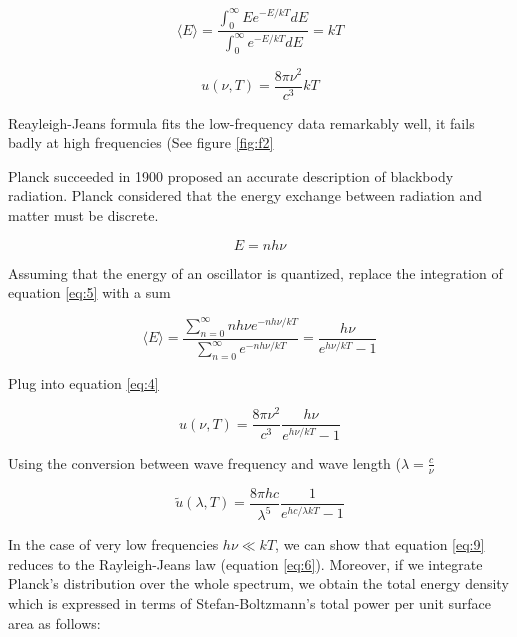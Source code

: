 \documentclass[10pt]{article}
\begin{document}
    \begin{equation} \label{eq:5}
        \langle E\rangle=\frac{\int_{0}^{\infty} E e^{-E / k T} d E}{\int_{0}^{\infty} e^{-E / k T} d E}=k T 
    \end{equation}

    \begin{equation} \label{eq:6}
        u(\nu, T)=\frac{8 \pi \nu^{2}}{c^{3}} k T 
    \end{equation}


    Reayleigh-Jeans formula fits the low-frequency data remarkably well, it fails badly at high frequencies (See figure \ref{fig:f2}
     
    Planck succeeded in 1900 proposed an accurate description of blackbody radiation. Planck considered that the energy exchange between radiation and matter must be discrete. 

    \begin{equation} \label{eq:7}
        E =n h \nu 
    \end{equation}

    Assuming that the energy of an oscillator is quantized, replace the integration of equation \ref{eq:5} with a sum

    \begin{equation} \label{eq:8}
        \langle E\rangle=\frac{\sum_{n=0}^{\infty} n h \nu e^{-n h \nu / k T}}{\sum_{n=0}^{\infty} e^{-n h \nu / k T}}=\frac{h \nu}{e^{h \nu / k T}-1} 
    \end{equation}

    Plug into equation \ref{eq:4}

    \begin{equation} \label{eq:9}
        u(\nu, T)=\frac{8 \pi \nu^{2}}{c^{3}} \frac{h \nu}{e^{h \nu / k T}-1} 
    \end{equation}

    Using the conversion between wave frequency and wave length ($\lambda = \frac{c}{\nu}$

    \begin{equation} \label{eq:10}
        \tilde{u}(\lambda, T)=\frac{8 \pi h c}{\lambda^{5}} \frac{1}{e^{h c / \lambda k T}-1} 
    \end{equation}

    In the case of very low frequencies $h \nu \ll k T$, we can show that equation \ref{eq:9} reduces to the Rayleigh-Jeans law (equation \ref{eq:6}). Moreover, if we integrate Planck's distribution over the whole spectrum, we obtain the total energy density which is expressed in terms of Stefan-Boltzmann's total power per unit surface area as follows:
\end{document}
